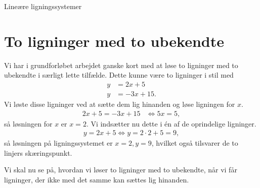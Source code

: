 \begin{center}
\Huge
Lineære ligningssystemer
\end{center}

\section*{To ligninger med to ubekendte}

Vi har i grundforløbet arbejdet ganske kort med at løse to ligninger med to ubekendte i særligt 
lette tilfælde. Dette kunne være to ligninger i stil med
\begin{align*}
	y &= 2x+5 \\
	y &= -3x+15. 
\end{align*}
Vi løste disse ligninger ved at sætte dem lig hinanden og løse ligningen for $x$. 
\begin{align*}
	2x + 5 = -3x + 15 & \Leftrightarrow 5x = 5,
\end{align*}
så løsningen for $x$ er $x = 2$. Vi indsætter nu dette i én af de oprindelige ligninger.
\begin{align*}
	y = 2x + 5 \Leftrightarrow y = 2\cdot 2 + 5 = 9,
\end{align*}
så løsningen på ligningssystemet er $x = 2, y = 9$, hvilket også tilsvarer de to linjers skæringspunkt. 

Vi skal nu se på, hvordan vi løser to ligninger med to ubekendte, når vi får ligninger, der ikke med det samme kan sættes lig hinanden. 

